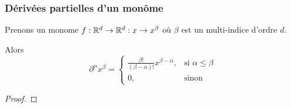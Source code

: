 \subsubsection{Dérivées partielles d'un monôme}

\begin{proposition}
	Prenons un monome $f : \mathbb{R}^{d} \rightarrow \mathbb{R}^{d} : x \rightarrow
	x^{\beta}$ où $\beta$ est un multi-indice d'ordre $d$.

	Alors
	\begin{equation*}
		\partial^{\alpha} x^{\beta} =
		\begin{cases}
			\displaystyle \frac{\beta!}{(\beta - \alpha)!} x^{\beta - \alpha}, &
			\mbox{si } \alpha
			\leq \beta \\
			0, & \mbox{sinon}
		\end{cases}
	\end{equation*}
\end{proposition}

\ifdefined\outputproof
\begin{proof}

\end{proof}
\fi
